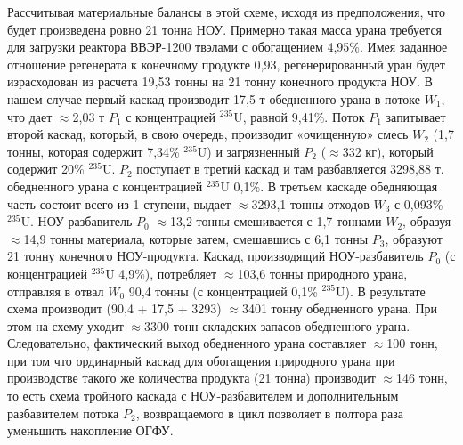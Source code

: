 Рассчитывая материальные балансы в этой схеме, исходя из предположения, что будет произведена ровно 21 тонна НОУ. Примерно такая масса урана требуется для загрузки реактора ВВЭР-1200 твэлами с обогащением 4,95\%. Имея заданное отношение регенерата к конечному продукте 0,93, регенерированный уран будет израсходован из расчета 19,53 тонны на 21 тонну конечного продукта НОУ. В нашем случае первый каскад производит 17,5 т обедненного урана в потоке $W_1$, что дает $\approx$2,03 т $P_1$ с концентрацией $^{235}$U, равной 9,41\%. Поток $P_1$ запитывает второй каскад, который, в свою очередь, производит «очищенную» смесь $W_2$ (1,7 тонны, которая содержит 7,34\% $^{235}$U) и загрязненный $P_2$ ($\approx$332 кг), который содержит 20\% $^{235}$U. $P_2$ поступает в третий каскад и там разбавляется 3298,88 т. обедненного урана с концентрацией $^{235}$U 0,1\%. В третьем каскаде обедняющая часть состоит всего из 1 ступени, выдает $\approx$3293,1 тонны отходов $W_3$  с 0,093\% $^{235}$U. НОУ-разбавитель $P_0$ $\approx$13,2 тонны смешивается с 1,7 тоннами $W_2$, образуя $\approx$14,9 тонны материала, которые затем, смешавшись с 6,1 тонны $P_3$, образуют 21 тонну конечного НОУ-продукта. Каскад, производящий НОУ-разбавитель $P_0$ (с концентрацией $^{235}$U 4,9\%), потребляет $\approx$103,6 тонны природного урана, отправляя в отвал $W_0$ 90,4 тонны (с концентрацией 0,1\% $^{235}$U). В результате схема производит (90,4 + 17,5 + 3293) $\approx$3401 тонну обедненного урана. При этом на схему уходит $\approx$3300 тонн складских запасов обедненного урана. Следовательно, фактический выход обедненного урана составляет $\approx$100 тонн, при том что ординарный каскад для обогащения природного урана при производстве такого же количества продукта (21 тонна) производит $\approx$146 тонн, то есть схема тройного каскада с НОУ-разбавителем и дополнительным разбавителем потока $P_2$, возвращаемого в цикл позволяет в полтора раза уменьшить накопление ОГФУ.

